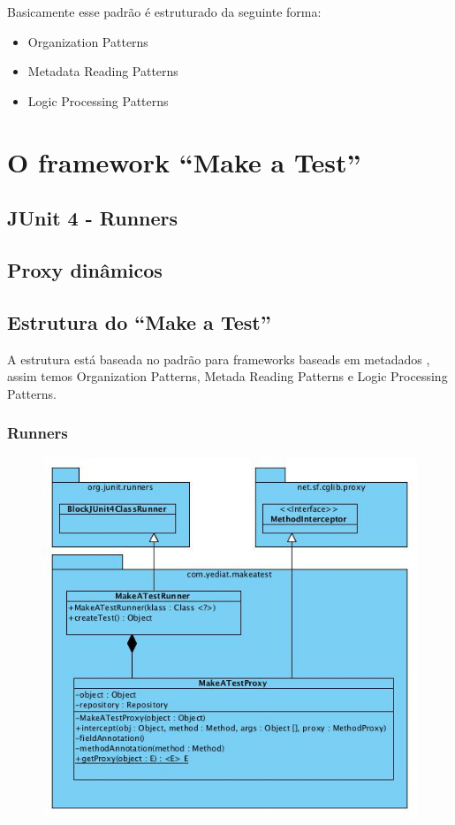 \documentclass{abnt}
\begin{document}
Basicamente esse padrão é estruturado da seguinte forma:\\

\begin{itemize}
	\item Organization Patterns
	\item Metadata Reading Patterns
	\item Logic Processing Patterns
\end{itemize}

\chapter{O framework ``Make a Test''}
\section{JUnit 4 - Runners}
\section{Proxy dinâmicos}
\section{Estrutura do ``Make a Test''}
A estrutura está baseada no padrão para frameworks baseads em metadados \cite{GUERRA-PATTERN}, assim temos Organization Patterns, Metada Reading Patterns e Logic Processing Patterns.
\subsection{Runners}

\begin{figure}
	\centering
	\includegraphics[]{uml/runners.jpg}
\end{figure}
\end{document}
